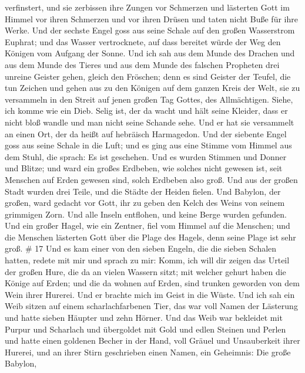 verfinstert, und sie zerbissen ihre Zungen vor Schmerzen 
und lästerten Gott im Himmel vor ihren Schmerzen und vor ihren Drüsen
und taten nicht Buße für ihre Werke.  Und der sechste Engel
goss aus seine Schale auf den großen Wasserstrom Euphrat; und das Wasser
vertrocknete, auf dass bereitet würde der Weg den Königen vom Aufgang
der Sonne.  Und ich sah aus dem Munde des Drachen und aus
dem Munde des Tieres und aus dem Munde des falschen Propheten drei
unreine Geister gehen, gleich den Fröschen;  denn es sind
Geister der Teufel, die tun Zeichen und gehen aus zu den Königen auf dem
ganzen Kreis der Welt, sie zu versammeln in den Streit auf jenen großen
Tag Gottes, des Allmächtigen.  Siehe, ich komme wie ein
Dieb. Selig ist, der da wacht und hält seine Kleider, dass er nicht bloß
wandle und man nicht seine Schande sehe.  Und er hat sie
versammelt an einen Ort, der da heißt auf hebräisch Harmagedon.
 Und der siebente Engel goss aus seine Schale in die Luft;
und es ging aus eine Stimme vom Himmel aus dem Stuhl, die sprach: Es ist
geschehen.  Und es wurden Stimmen und Donner und Blitze;
und ward ein großes Erdbeben, wie solches nicht gewesen ist, seit
Menschen auf Erden gewesen sind, solch Erdbeben also groß. 
Und aus der großen Stadt wurden drei Teile, und die Städte der Heiden
fielen. Und Babylon, der großen, ward gedacht vor Gott, ihr zu geben den
Kelch des Weins von seinem grimmigen Zorn.  Und alle Inseln
entflohen, und keine Berge wurden gefunden.  Und ein großer
Hagel, wie ein Zentner, fiel vom Himmel auf die Menschen; und die
Menschen lästerten Gott über die Plage des Hagels, denn seine Plage ist
sehr groß. \# 17  Und es kam einer von den sieben Engeln,
die die sieben Schalen hatten, redete mit mir und sprach zu mir: Komm,
ich will dir zeigen das Urteil der großen Hure, die da an vielen Wassern
sitzt;  mit welcher gehurt haben die Könige auf Erden; und
die da wohnen auf Erden, sind trunken geworden von dem Wein ihrer
Hurerei.  Und er brachte mich im Geist in die Wüste. Und ich
sah ein Weib sitzen auf einem scharlachfarbenen Tier, das war voll Namen
der Lästerung und hatte sieben Häupter und zehn Hörner.  Und
das Weib war bekleidet mit Purpur und Scharlach und übergoldet mit Gold
und edlen Steinen und Perlen und hatte einen goldenen Becher in der
Hand, voll Gräuel und Unsauberkeit ihrer Hurerei,  und an
ihrer Stirn geschrieben einen Namen, ein Geheimnis: Die große Babylon,
